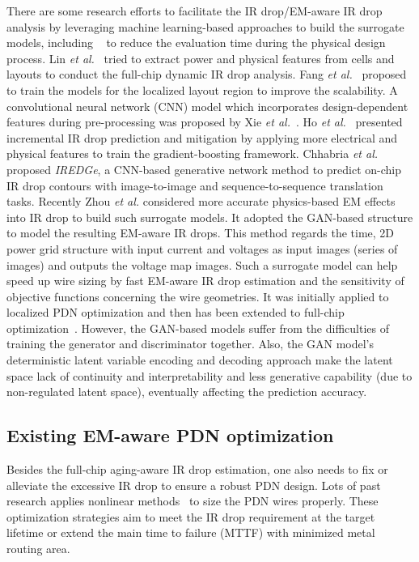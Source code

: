 There are some research efforts to facilitate the IR drop/EM-aware IR drop analysis by leveraging machine learning-based approaches to build the surrogate models, including ~\cite{LinFang:2018vts,Fang:2018dynireco,HoKahng:ICCAD'19,Xie:2020powernet,Sachin:ASPDAC'21,Chen:TCAD'23} to reduce the evaluation time during the physical design process.  Lin {\it et al.}~\cite{LinFang:2018vts} tried to extract power and physical features from cells and layouts to conduct the full-chip dynamic IR drop analysis. Fang {\it et al.}~\cite{Fang:2018dynireco} proposed to train the models for the localized layout region to improve the scalability.  A convolutional neural network (CNN) model which incorporates design-dependent features during pre-processing was proposed by Xie {\it et al.}~\cite{Xie:2020powernet}. Ho {\it et al.}~\cite{HoKahng:ICCAD'19} presented incremental IR drop prediction and mitigation by applying more electrical and physical features to train the gradient-boosting framework. Chhabria {\it et al.}~\cite{Sachin:ASPDAC'21} proposed {\it IREDGe}, a CNN-based generative network method to predict on-chip IR drop contours with image-to-image and sequence-to-sequence translation tasks.
Recently Zhou {\it et al.} \cite{ZhouJin:ICCAD'20} considered more accurate physics-based EM effects into IR drop to build such surrogate models. It adopted the GAN-based structure to model the resulting EM-aware IR drops.  This method regards the time, 2D power grid structure with input current and voltages as input images (series of images) and outputs the voltage map images. Such a surrogate model can help speed up wire sizing by fast EM-aware IR drop estimation and the sensitivity of objective functions concerning the wire geometries. It was initially applied to localized PDN optimization and then has been extended to full-chip optimization~\cite{HanLiu:TCAD'22-23}.
However, the GAN-based models suffer from the difficulties of training the generator and discriminator together. Also, the GAN model's deterministic latent variable encoding and decoding approach make the latent space lack of continuity and interpretability and less generative capability (due to non-regulated latent space), eventually affecting the prediction accuracy.


\subsection{Existing EM-aware PDN optimization}
 \label{subsec:exist_pgfix}
Besides the full-chip aging-aware IR drop estimation, one also needs to fix or alleviate the excessive IR drop to ensure a robust PDN design. Lots of past research applies nonlinear methods~\cite{ChBr:TCAD'88,DuMa:DAC'89,Tan:DAC'99,Wang:TCAD'05,ZhouSun:TVLSI'19, Sukharev:2019pg} to size the PDN wires properly. These optimization strategies aim to meet the IR drop requirement at the target lifetime or extend the main time to failure (MTTF) with minimized metal routing area.

